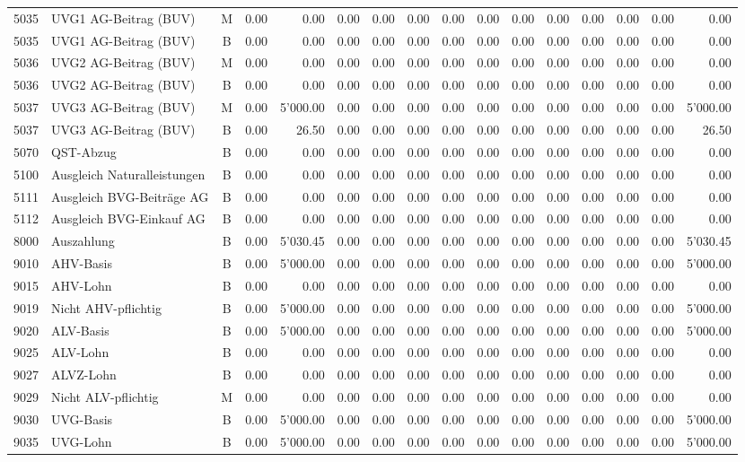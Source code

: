 \documentclass[8pt,a4paper]{extarticle}
\begin{document}
\begin{longtable}{@{\extracolsep{\fill}} l l c r r r r r r r r r r r r r}
5035&UVG1 AG-Beitrag (BUV)&M&0.00&0.00&0.00&0.00&0.00&0.00&0.00&0.00&0.00&0.00&0.00&0.00&0.00\\
5035&UVG1 AG-Beitrag (BUV)&B&0.00&0.00&0.00&0.00&0.00&0.00&0.00&0.00&0.00&0.00&0.00&0.00&0.00\\
5036&UVG2 AG-Beitrag (BUV)&M&0.00&0.00&0.00&0.00&0.00&0.00&0.00&0.00&0.00&0.00&0.00&0.00&0.00\\
5036&UVG2 AG-Beitrag (BUV)&B&0.00&0.00&0.00&0.00&0.00&0.00&0.00&0.00&0.00&0.00&0.00&0.00&0.00\\
5037&UVG3 AG-Beitrag (BUV)&M&0.00&5'000.00&0.00&0.00&0.00&0.00&0.00&0.00&0.00&0.00&0.00&0.00&5'000.00\\
5037&UVG3 AG-Beitrag (BUV)&B&0.00&26.50&0.00&0.00&0.00&0.00&0.00&0.00&0.00&0.00&0.00&0.00&26.50\\
5070&QST-Abzug&B&0.00&0.00&0.00&0.00&0.00&0.00&0.00&0.00&0.00&0.00&0.00&0.00&0.00\\
5100&Ausgleich Naturalleistungen&B&0.00&0.00&0.00&0.00&0.00&0.00&0.00&0.00&0.00&0.00&0.00&0.00&0.00\\
5111&Ausgleich BVG-Beiträge AG&B&0.00&0.00&0.00&0.00&0.00&0.00&0.00&0.00&0.00&0.00&0.00&0.00&0.00\\
5112&Ausgleich BVG-Einkauf AG&B&0.00&0.00&0.00&0.00&0.00&0.00&0.00&0.00&0.00&0.00&0.00&0.00&0.00\\
8000&Auszahlung&B&0.00&5'030.45&0.00&0.00&0.00&0.00&0.00&0.00&0.00&0.00&0.00&0.00&5'030.45\\
9010&AHV-Basis&B&0.00&5'000.00&0.00&0.00&0.00&0.00&0.00&0.00&0.00&0.00&0.00&0.00&5'000.00\\
9015&AHV-Lohn&B&0.00&0.00&0.00&0.00&0.00&0.00&0.00&0.00&0.00&0.00&0.00&0.00&0.00\\
9019&Nicht AHV-pflichtig&B&0.00&5'000.00&0.00&0.00&0.00&0.00&0.00&0.00&0.00&0.00&0.00&0.00&5'000.00\\
9020&ALV-Basis&B&0.00&5'000.00&0.00&0.00&0.00&0.00&0.00&0.00&0.00&0.00&0.00&0.00&5'000.00\\
9025&ALV-Lohn&B&0.00&0.00&0.00&0.00&0.00&0.00&0.00&0.00&0.00&0.00&0.00&0.00&0.00\\
9027&ALVZ-Lohn&B&0.00&0.00&0.00&0.00&0.00&0.00&0.00&0.00&0.00&0.00&0.00&0.00&0.00\\
9029&Nicht ALV-pflichtig&M&0.00&0.00&0.00&0.00&0.00&0.00&0.00&0.00&0.00&0.00&0.00&0.00&0.00\\
9030&UVG-Basis&B&0.00&5'000.00&0.00&0.00&0.00&0.00&0.00&0.00&0.00&0.00&0.00&0.00&5'000.00\\
9035&UVG-Lohn&B&0.00&5'000.00&0.00&0.00&0.00&0.00&0.00&0.00&0.00&0.00&0.00&0.00&5'000.00\\

\end{longtable}
\end{document}
